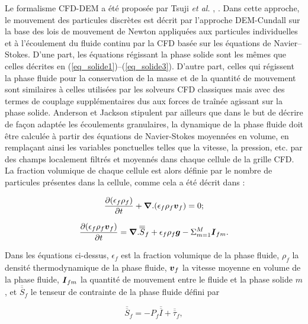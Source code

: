 Le formalisme CFD-DEM a été proposée par Tsuji {\it et al.} \cite{tsuji1992lagrangian}, \cite{kawaguchi1998numerical}. Dans cette approche, le mouvement des particules discrètes est décrit par l'approche DEM-Cundall sur la base des lois de mouvement de Newton appliquées aux particules individuelles et à l'écoulement du fluide continu par la CFD basée sur les équations de Navier–Stokes. D'une part, les équations régissant la phase solide sont les mêmes que celles décrites en (\ref{eq_solide1})--(\ref{eq_solide3}). D'autre part, celles qui régissent la phase fluide pour la conservation de la masse et de la quantité de mouvement sont similaires à celles utilisées par les solveurs CFD classiques mais avec des termes de couplage supplémentaires dus aux forces de traînée agissant sur la phase solide. Anderson et Jackson \cite{anderson1967fluid} stipulent par ailleurs que dans le but de décrire de façon adaptée les écoulements granulaires, la dynamique de la phase fluide doit être calculée à partir des équations de Navier-Stokes moyennées en volume, en remplaçant ainsi les variables ponctuelles telles que
la vitesse, la pression, etc. par des champs localement filtrés et moyennés dans chaque cellule de la grille CFD. La fraction volumique de chaque cellule est alors définie par le nombre de particules présentes dans la cellule, comme cela a été décrit dans \cite{garg2012documentation}:

\begin{equation} \label{eq_fluide1}
\frac{\partial(\epsilon_f \rho_f)}{\partial t} + \boldsymbol{\nabla} . (\epsilon_f \rho_f \boldsymbol{v}_f) = 0 ;
\end{equation}

\begin{equation} \label{eq_fluide1}
\frac{\partial(\epsilon_f \rho_f \boldsymbol{v}_f)}{\partial t} = \boldsymbol{\nabla} . \overline{\overline{S}}_f + \epsilon_f \rho_f  \boldsymbol{g} - \Sigma_{m=1}^{M}\boldsymbol{I}_{fm} .
\end{equation}

Dans les équations ci-dessus, $\epsilon_f$ est la fraction volumique de la phase fluide, $\rho_f$ la densité thermodynamique de la phase fluide, $\boldsymbol{v}_f$ la vitesse moyenne en volume de la phase fluide, $\boldsymbol{I}_{fm}$ la quantité de mouvement entre le fluide et la phase solide $m$, et $\overline{\overline{S}}_f$ le tenseur de contrainte de la phase fluide défini par

\begin{equation} \label{eq_fluide1}
\overline{\overline{S}}_f = -P_f \overline{\overline{I}} + \overline{\overline{\tau}}_f,
\end{equation}


